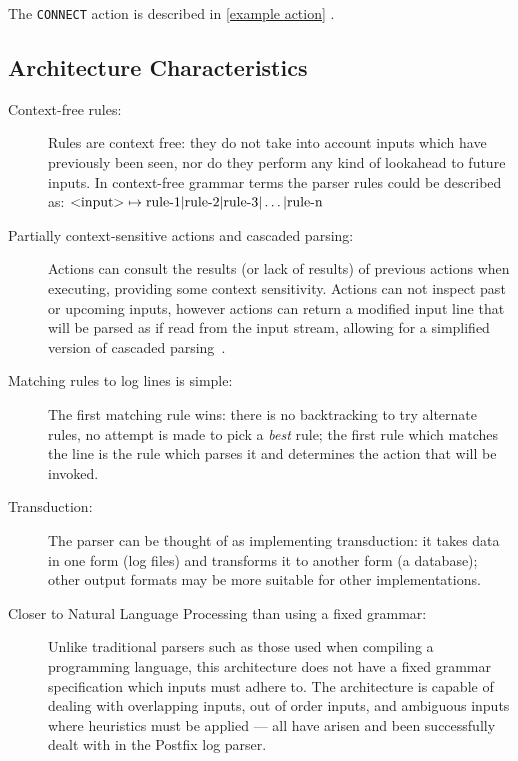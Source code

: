 \documentclass[draft]{svmult}
\newcommand{\sectionref}[1]{%
    \textsection{}\vref*{#1}%
}
\begin{document}
\noindent{}The \texttt{CONNECT} action is described in \sectionref{example
action}.


\subsection{Architecture Characteristics}

\label{Architecture characteristics}

\begin{description}

    \item [Context-free rules:]  Rules are context free: they do not take
        into account inputs which have previously been seen, nor do they
        perform any kind of lookahead to future inputs.  In context-free
        grammar terms the parser rules could be described as:
        $\text{\textless{}input\textgreater{}} \mapsto \text{rule-1} |
        \text{rule-2} | \text{rule-3} | \dots | \text{rule-n}$

    \item [Partially context-sensitive actions and cascaded parsing:]
        Actions can consult the results (or lack of results) of previous
        actions when executing, providing some context sensitivity.
        Actions can not inspect past or upcoming inputs, however actions
        can return a modified input line that will be parsed as if read
        from the input stream, allowing for a simplified version of
        cascaded parsing~\cite{cascaded-parsing}.

    \item [Matching rules to log lines is simple:]  The first matching rule
        wins: there is no backtracking to try alternate rules, no attempt
        is made to pick a \textit{best\/} rule; the first rule which
        matches the line is the rule which parses it and determines the
        action that will be invoked.

    \item [Transduction:]  The parser can be thought of as implementing
        transduction: it takes data in one form (log files) and transforms
        it to another form (a database); other output formats may be more
        suitable for other implementations.

    \item [Closer to Natural Language Processing than using a fixed
        grammar:] Unlike traditional parsers such as those used when
        compiling a programming language, this architecture does not have a
        fixed grammar specification which inputs must adhere to.  The
        architecture is capable of dealing with overlapping inputs, out of
        order inputs, and ambiguous inputs where heuristics must be applied
        --- all have arisen and been successfully dealt with in the Postfix
        log parser.


\end{description}
\end{document}
